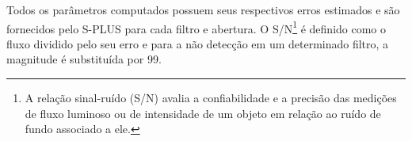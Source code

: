 Todos os parâmetros computados possuem seus respectivos erros estimados e são fornecidos pelo S-PLUS para cada filtro e abertura. O S/N\footnote[11]{A relação sinal-ruído (S/N) avalia a confiabilidade e a precisão das medições de fluxo luminoso ou de intensidade de um objeto em relação ao ruído de fundo associado a ele.} é definido como o fluxo dividido pelo seu erro e para a não detecção em um determinado filtro, a magnitude é substituída por 99.



